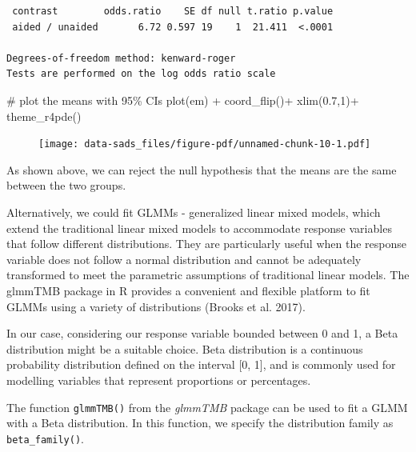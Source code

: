 \documentclass[
  letterpaper,
]{book}
\newenvironment{Shaded}{\begin{snugshade}}{\end{snugshade}}
\newcommand{\CommentTok}[1]{\textcolor[rgb]{0.37,0.37,0.37}{#1}}
\newcommand{\DecValTok}[1]{\textcolor[rgb]{0.68,0.00,0.00}{#1}}
\newcommand{\FloatTok}[1]{\textcolor[rgb]{0.68,0.00,0.00}{#1}}
\newcommand{\FunctionTok}[1]{\textcolor[rgb]{0.28,0.35,0.67}{#1}}
\newcommand{\NormalTok}[1]{\textcolor[rgb]{0.00,0.23,0.31}{#1}}
\newcommand{\SpecialCharTok}[1]{\textcolor[rgb]{0.37,0.37,0.37}{#1}}
\begin{document}
\begin{verbatim}
 contrast        odds.ratio    SE df null t.ratio p.value
 aided / unaided       6.72 0.597 19    1  21.411  <.0001

Degrees-of-freedom method: kenward-roger 
Tests are performed on the log odds ratio scale 
\end{verbatim}

\begin{Shaded}
\begin{Highlighting}[]
\CommentTok{\# plot the means with 95\% CIs}
\FunctionTok{plot}\NormalTok{(em) }\SpecialCharTok{+}
  \FunctionTok{coord\_flip}\NormalTok{()}\SpecialCharTok{+}
  \FunctionTok{xlim}\NormalTok{(}\FloatTok{0.7}\NormalTok{,}\DecValTok{1}\NormalTok{)}\SpecialCharTok{+}
  \FunctionTok{theme\_r4pde}\NormalTok{()}
\end{Highlighting}
\end{Shaded}

\begin{figure}[H]

{\centering \texttt{[image: data-sads\_files/figure-pdf/unnamed-chunk-10-1.pdf]}

}

\end{figure}

As shown above, we can reject the null hypothesis that the means are the
same between the two groups.

Alternatively, we could fit GLMMs - generalized linear mixed models,
which extend the traditional linear mixed models to accommodate response
variables that follow different distributions. They are particularly
useful when the response variable does not follow a normal distribution
and cannot be adequately transformed to meet the parametric assumptions
of traditional linear models. The glmmTMB package in R provides a
convenient and flexible platform to fit GLMMs using a variety of
distributions (Brooks et al. 2017).

In our case, considering our response variable bounded between 0 and 1,
a Beta distribution might be a suitable choice. Beta distribution is a
continuous probability distribution defined on the interval {[}0, 1{]},
and is commonly used for modelling variables that represent proportions
or percentages.

The function \texttt{glmmTMB()} from the \emph{glmmTMB} package can be
used to fit a GLMM with a Beta distribution. In this function, we
specify the distribution family as \texttt{beta\_family()}.
\end{document}
